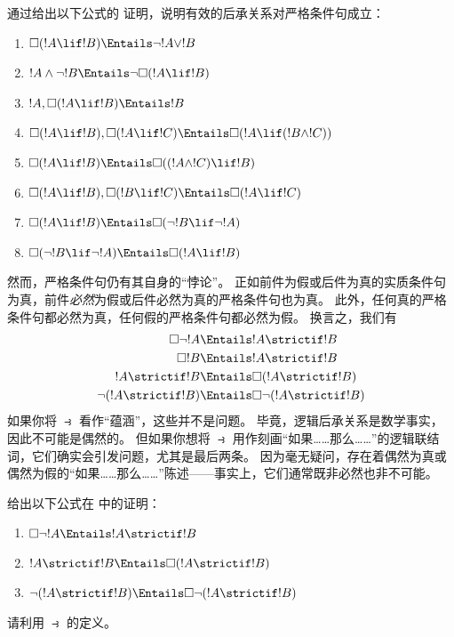 \documentclass[../../../include/open-logic-section]{subfiles}
\begin{document}
\begin{prob}
  通过给出以下公式的  证明，说明有效的后承关系对严格条件句成立：
  \begin{enumerate}
  \item  $\Box(!A \lif !B) \Entails \lnot !A \lor !B$
  \item  $!A \land \lnot !B \Entails \lnot\Box(!A \lif !B)$
  \item  $!A, \Box(!A \lif !B) \Entails !B$
  \item  $\Box(!A \lif !B), \Box(!A \lif !C) \Entails \Box(!A \lif (!B
    \land !C))$
  \item  $\Box(!A \lif !B) \Entails \Box((!A \land !C) \lif !B)$
  \item  $\Box(!A \lif !B), \Box(!B \lif !C) \Entails \Box(!A
    \lif !C)$
  \item  $\Box(!A \lif !B) \Entails \Box(\lnot !B \lif \lnot !A)$
  \item  $\Box(\lnot !B \lif \lnot !A) \Entails \Box(!A \lif !B)$
  \end{enumerate}
  \end{prob}

然而，严格条件句仍有其自身的“悖论”。
正如前件为假或后件为真的实质条件句为真，前件\emph{必然}为假或后件必然为真的严格条件句也为真。
此外，任何真的严格条件句都必然为真，任何假的严格条件句都必然为假。
换言之，我们有
\begin{align}
  \Box \lnot !A & \Entails !A \strictif !B\\
  \Box !B & \Entails !A \strictif !B\\
  !A \strictif !B& \Entails \Box(!A \strictif !B)\\
  \lnot(!A \strictif !B) & \Entails \Box\lnot(!A \strictif !B)
\end{align}
如果你将 $\strictif$ 看作“蕴涵”，这些并不是问题。
毕竟，逻辑后承关系是数学事实，因此不可能是偶然的。
但如果你想将 $\strictif$ 用作刻画“如果……那么……”的逻辑联结词，它们确实会引发问题，尤其是最后两条。
因为毫无疑问，存在着偶然为真或偶然为假的“如果……那么……”陈述——事实上，它们通常既非必然也非不可能。

\begin{prob}
  给出以下公式在  中的证明：
  \begin{enumerate}
    \item  $\Box \lnot !A \Entails !A \strictif !B$
    \item $!A \strictif !B \Entails \Box(!A \strictif !B)$
    \item $\lnot(!A \strictif !B)  \Entails \Box\lnot(!A \strictif !B)$
  \end{enumerate}
  请利用 $\strictif$ 的定义。
\end{prob}
\end{document}
